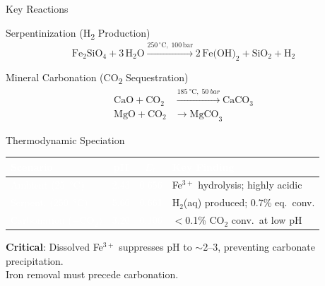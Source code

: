 \documentclass[aspectratio=169]{beamer}
\begin{document}
\begin{frame}{Key Reactions}
\begin{block}{Serpentinization (H\textsubscript{2} Production)}
\vspace{-6pt}
\begin{equation*}
    \text{Fe}_2\text{SiO}_4 + 3\,\text{H}_2\text{O}
    \xrightarrow{250\,^\circ\text{C},\;100\,\text{bar}}
    2\,\text{Fe(OH)}_2 + \text{SiO}_2 + \text{H}_2
\end{equation*}
\end{block}
\vspace{4pt}
\begin{block}{Mineral Carbonation (CO\textsubscript{2} Sequestration)}
\vspace{-6pt}
\begin{align*}
    \text{CaO} + \text{CO}_2 &\xrightarrow{\SI{185}{\degreeCelsius},\;\SI{50}{bar}} \text{CaCO}_3 \\
    \text{MgO} + \text{CO}_2 &\longrightarrow \text{MgCO}_3
\end{align*}
\end{block}
\end{frame}

\begin{frame}{Thermodynamic Speciation}
\begin{table}
\centering
\small
\begin{tabular}{@{}lccp{5cm}@{}}
\toprule
\textbf{\textcolor{white}{Scenario}} & \textbf{\textcolor{white}{pH}} & \textbf{\textcolor{white}{$E_h$}} & \textbf{\textcolor{white}{Key Finding}} \\
\midrule
\textcolor{white}{Ambient (\SI{25}{\degreeCelsius})} & \textcolor{white}{2.43} & \textcolor{white}{0.656} & \textcolor{StepGrey}{Fe$^{3+}$ hydrolysis; highly acidic} \\
\textcolor{white}{Serpent. (\SI{250}{\degreeCelsius})} & \textcolor{white}{5.60} & \textcolor{white}{0.661} & \textcolor{StepGrey}{H$_2$(aq) produced; 0.7\% eq.\ conv.} \\
\textcolor{white}{Carbonation (+CO$_2$)} & \textcolor{white}{3.20} & \textcolor{white}{0.106} & \textcolor{StepGrey}{$<$0.1\% CO$_2$ conv.\ at low pH} \\
\bottomrule
\end{tabular}
\end{table}
\vspace{10pt}
\centering
\textcolor{StepYellow}{\textbf{Critical}}: Dissolved Fe$^{3+}$ suppresses pH to $\sim$2--3, preventing carbonate precipitation.\\
Iron removal must precede carbonation.
\end{frame}
\end{document}
